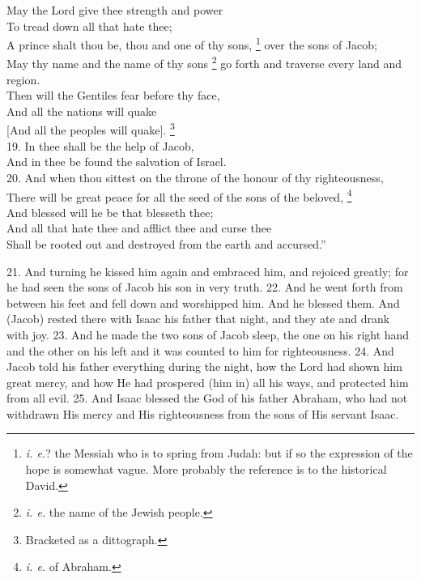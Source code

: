 May the Lord give thee strength and power\\
To tread down all that hate thee;\\
A prince shalt thou be, thou and one of thy sons, \footnote{\emph{i. e.}? the Messiah who is to spring from Judah: but if so the expression of the hope is somewhat vague. More probably the reference is to the historical David.} over the sons of Jacob;\\
May thy name and the name of thy sons \footnote{\emph{i. e.} the name of the Jewish people.} go forth and traverse every land and region.\\
Then will the Gentiles fear before thy face,\\
And all the nations will quake\\
{}[And all the peoples will quake]. \footnote{Bracketed as a dittograph.}\\
19. In thee shall be the help of Jacob,\\
And in thee be found the salvation of Israel.\\
20. And when thou sittest on the throne of the honour of thy righteousness,\\
There will be great peace for all the seed of the sons of the beloved, \footnote{\emph{i. e.} of Abraham.}\\
And blessed will he be that blesseth thee;\\
And all that hate thee and afflict thee and curse thee\\
Shall be rooted out and destroyed from the earth and accursed.''

21. And turning he kissed him again and embraced him, and rejoiced greatly; for he had seen the sons of Jacob his son in very truth. 22. And he went forth from between his feet and fell down and worshipped him. And he blessed them. And (Jacob) rested there with Isaac his father that night, and they ate and drank with joy. 23. And he made the two sons of Jacob sleep, the one on his right hand and the other on his left and it was counted to him for righteousness. 24. And Jacob told his father everything during the night, how the Lord had shown him great mercy, and how He had prospered (him in) all his ways, and protected him from all evil. 25. And Isaac blessed the God of his father Abraham, who had not withdrawn His mercy and His righteousness from the sons of His servant Isaac.


